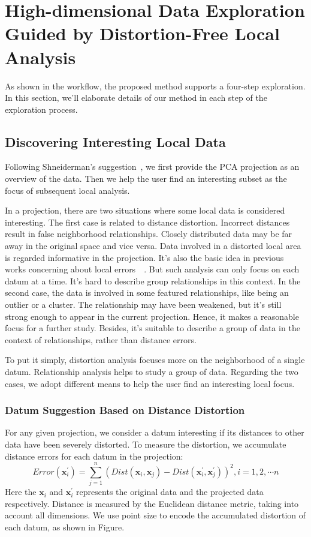 \section{High-dimensional Data Exploration Guided by Distortion-Free Local Analysis}
As shown in the workflow, the proposed method supports a four-step exploration. In this section, we'll elaborate details of our method in each step of the exploration process.
\label{section:method}
\subsection{Discovering Interesting Local Data}
Following Shneiderman's suggestion~\cite{DBLP:conf/vl/Shneiderman96}, we first provide the PCA projection as an overview of the data. Then we help the user find an interesting subset as the focus of subsequent local analysis.

In a projection, there are two situations where some local data is considered interesting. The first case is related to distance distortion. Incorrect distances result in false neighborhood relationships. Closely distributed data may be far away in the original space and vice versa. Data involved in a distorted local area is regarded informative in the projection. It's also the basic idea in previous works concerning about local errors~\cite{DBLP:journals/cg/MartinsCMT14}~\cite{DBLP:journals/tvcg/StahnkeDMT16}. But such analysis can only focus on each datum at a time. It's hard to describe group relationships in this context. In the second case, the data is involved in some featured relationships, like being an outlier or a cluster. The relationship may have been weakened, but it's still strong enough to appear in the current projection. Hence, it makes a reasonable focus for a further study. Besides, it's suitable to describe a group of data in the context of relationships, rather than distance errors.

To put it simply, distortion analysis focuses more on the neighborhood of a single datum. Relationship analysis helps to study a group of data. Regarding the two cases, we adopt different means to help the user find an interesting local focus.

\subsubsection{Datum Suggestion Based on Distance Distortion}
For any given projection, we consider a datum interesting if its distances to other data have been severely distorted. To measure the distortion, we accumulate distance errors for each datum in the projection:
$$Error(\mathbf{x}_{i}^{\prime}) = \sum\limits_{j=1}^{n}(Dist(\mathbf{x}_{i}, \mathbf{x}_{j}) - Dist(\mathbf{x}_{i}^{\prime}, \mathbf{x}_{j}^{\prime}))^{2}, i = 1,2,\cdots n$$
Here the $\mathbf{x}_{i}$ and $\mathbf{x}_{i}^{\prime}$ represents the original data and the projected data respectively. Distance is measured by the Euclidean distance metric, taking into account all dimensions. We use point size to encode the accumulated distortion of each datum, as shown in Figure. 


